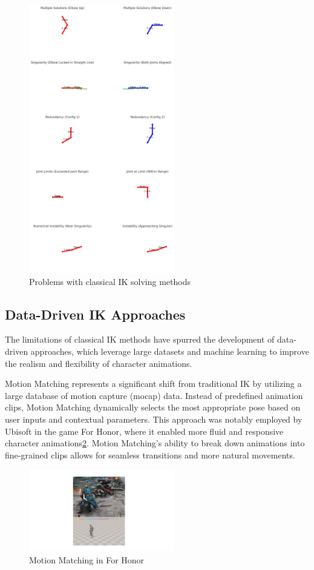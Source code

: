 \documentclass[../../main.tex]{subfiles}
\begin{document}
\begin{figure}
  \centering \includegraphics[width = 2.5in]{chapters/motion_matching/images/problems_classical.png}
  \caption{Problems with classical IK solving methods}
  \label{fig:problems_classical}
\end{figure}

\subsection{Data-Driven IK Approaches}
\label{ch:motion_matching:related_work:data_driven_ik}

The limitations of classical IK methods have spurred the development of data-driven approaches, which leverage large datasets and machine learning to improve the realism and flexibility of character animations.

Motion Matching represents a significant shift from traditional IK by utilizing a large database of motion capture (mocap) data. Instead of predefined animation clips, Motion Matching dynamically selects the most appropriate pose based on user inputs and contextual parameters. This approach was notably employed by Ubisoft in the game For Honor, where it enabled more fluid and responsive character animations\ref{fig:for_honor}. Motion Matching's ability to break down animations into fine-grained clips allows for seamless transitions and more natural movements\cite{TODO}.

\begin{figure}
  \centering \includegraphics[width = 2.5in]{chapters/motion_matching/images/for_honor.png}
  \caption{Motion Matching in For Honor}
  \label{fig:for_honor}
\end{figure}
\end{document}
